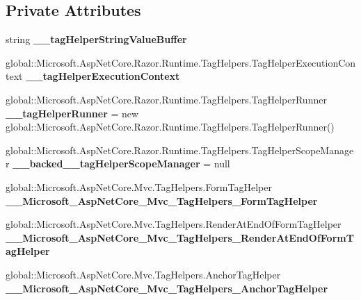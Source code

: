 \subsection*{Private Attributes}
\begin{DoxyCompactItemize}
\item 
\mbox{\label{class_asp_net_core_1_1_views___shared____sidebar_a38b3cd4d6d282248c8c36460a88f9802}} 
string {\bfseries \+\_\+\+\_\+tag\+Helper\+String\+Value\+Buffer}
\item 
\mbox{\label{class_asp_net_core_1_1_views___shared____sidebar_a5dea47ed6c244f200dfee4ea4d5a0436}} 
global\+::\+Microsoft.\+Asp\+Net\+Core.\+Razor.\+Runtime.\+Tag\+Helpers.\+Tag\+Helper\+Execution\+Context {\bfseries \+\_\+\+\_\+tag\+Helper\+Execution\+Context}
\item 
\mbox{\label{class_asp_net_core_1_1_views___shared____sidebar_aaf60eefb3d8088f799eaaef238f08e63}} 
global\+::\+Microsoft.\+Asp\+Net\+Core.\+Razor.\+Runtime.\+Tag\+Helpers.\+Tag\+Helper\+Runner {\bfseries \+\_\+\+\_\+tag\+Helper\+Runner} = new global\+::\+Microsoft.\+Asp\+Net\+Core.\+Razor.\+Runtime.\+Tag\+Helpers.\+Tag\+Helper\+Runner()
\item 
\mbox{\label{class_asp_net_core_1_1_views___shared____sidebar_ace2f3c9a0175223fb00d87b631997877}} 
global\+::\+Microsoft.\+Asp\+Net\+Core.\+Razor.\+Runtime.\+Tag\+Helpers.\+Tag\+Helper\+Scope\+Manager {\bfseries \+\_\+\+\_\+backed\+\_\+\+\_\+tag\+Helper\+Scope\+Manager} = null
\item 
\mbox{\label{class_asp_net_core_1_1_views___shared____sidebar_a4ec5a41beaf8e03e09a7d86171a21415}} 
global\+::\+Microsoft.\+Asp\+Net\+Core.\+Mvc.\+Tag\+Helpers.\+Form\+Tag\+Helper {\bfseries \+\_\+\+\_\+\+Microsoft\+\_\+\+Asp\+Net\+Core\+\_\+\+Mvc\+\_\+\+Tag\+Helpers\+\_\+\+Form\+Tag\+Helper}
\item 
\mbox{\label{class_asp_net_core_1_1_views___shared____sidebar_a4ae44714b6bf050e2b31afd63ab3248c}} 
global\+::\+Microsoft.\+Asp\+Net\+Core.\+Mvc.\+Tag\+Helpers.\+Render\+At\+End\+Of\+Form\+Tag\+Helper {\bfseries \+\_\+\+\_\+\+Microsoft\+\_\+\+Asp\+Net\+Core\+\_\+\+Mvc\+\_\+\+Tag\+Helpers\+\_\+\+Render\+At\+End\+Of\+Form\+Tag\+Helper}
\item 
\mbox{\label{class_asp_net_core_1_1_views___shared____sidebar_a87ec4ad4303531b05d268752f0cbfe7e}} 
global\+::\+Microsoft.\+Asp\+Net\+Core.\+Mvc.\+Tag\+Helpers.\+Anchor\+Tag\+Helper {\bfseries \+\_\+\+\_\+\+Microsoft\+\_\+\+Asp\+Net\+Core\+\_\+\+Mvc\+\_\+\+Tag\+Helpers\+\_\+\+Anchor\+Tag\+Helper}
\end{DoxyCompactItemize}

